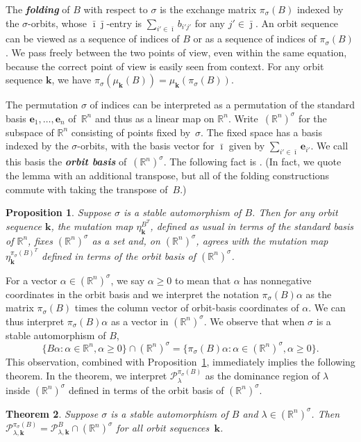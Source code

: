 \documentclass{amsart}
\newtheorem{proposition}{Proposition}[section]
\newtheorem{theorem}[proposition]{Theorem}
\theoremstyle{definition}
\theoremstyle{remark}
\numberwithin{equation}{section}
\newcommand{\newword}[1]{\textbf{\emph{#1}}}
\newcommand{\reals}{\mathbb R}
\newcommand{\sett}[1]{{\bigl\lbrace #1 \bigr\rbrace}}
\newcommand{\0}{{\mathbf{0}}}
\newcommand{\kk}{{\boldsymbol{k}}}
\newcommand{\e}{\mathbf{e}}
\renewcommand{\P}{\mathcal{P}}
\begin{document}
The \newword{folding} of $B$ with respect to $\sigma$ is the exchange matrix $\pi_\sigma(B)$ indexed by the $\sigma$-orbits, whose $\bar\imath\bar\jmath$-entry is $\sum_{i'\in\bar\imath}b_{i'j'}$ for any $j'\in\bar\jmath$.
An orbit sequence can be viewed as a sequence of indices of $B$ or as a sequence of indices of $\pi_\sigma(B)$.
We pass freely between the two points of view, even within the same equation, because the correct point of view is easily seen from context.
For any orbit sequence $\kk$, we have $\pi_\sigma(\mu_\kk(B))=\mu_\kk(\pi_\sigma(B))$.

The permutation $\sigma$ of indices can be interpreted as a permutation of the standard basis $\e_1,\ldots,\e_n$ of~$\reals^n$ and thus as a linear map on $\reals^n$.
Write~$(\reals^n)^\sigma$ for the subspace of $\reals^n$ consisting of points fixed by~$\sigma$.
The fixed space has a basis indexed by the $\sigma$-orbits, with the basis vector for $\bar\imath$ given by $\sum_{i'\in\bar\imath}\e_{i'}$.
We call this basis the \newword{orbit basis} of~$(\reals^n)^\sigma$.
The following fact is \cite[Lemma~2.4.6]{VielThesis}. 
(In fact, we quote the lemma with an additional transpose, but all of the folding constructions commute with taking the transpose of~$B$.)
\begin{proposition}\label{VielLemma}
Suppose $\sigma$ is a stable automorphism of $B$.
Then for any orbit sequence $\kk$, the mutation map $\eta^{B^T}_\kk$, defined as usual in terms of the standard basis of $\reals^n$, fixes $(\reals^n)^\sigma$ as a set and, on $(\reals^n)^\sigma$, agrees with the mutation map $\eta_\kk^{\pi_\sigma(B)^T}$ defined in terms of the orbit basis of $(\reals^n)^\sigma$.
\end{proposition}

For a vector $\alpha\in(\reals^n)^\sigma$, we say $\alpha\ge0$ to mean that $\alpha$ has nonnegative coordinates in the orbit basis and we interpret the notation $\pi_\sigma(B)\alpha$ as the matrix $\pi_\sigma(B)$ times the column vector of orbit-basis coordinates of $\alpha$.
We can thus interpret $\pi_\sigma(B)\alpha$ as a vector in $(\reals^n)^\sigma$.
We observe that when $\sigma$ is a stable automorphism of $B$,
\[\sett{B\alpha:\alpha\in\reals^n,\alpha\ge0}\cap(\reals^n)^\sigma=\sett{\pi_\sigma(B)\alpha:\alpha\in(\reals^n)^\sigma,\alpha\ge0}.\]
This observation, combined with Proposition~\ref{VielLemma}, immediately implies the following theorem.
In the theorem, we interpret $\P_\lambda^{\pi_\sigma(B)}$ as the dominance region of $\lambda$ inside $(\reals^n)^\sigma$ defined in terms of the orbit basis of $(\reals^n)^\sigma$.
\begin{theorem}\label{fold dom reg}
Suppose $\sigma$ is a stable automorphism of $B$ and $\lambda\in(\reals^n)^\sigma$.
Then $\P_{\lambda,\kk}^{\pi_\sigma(B)}=\P_{\lambda,\kk}^B\cap(\reals^n)^\sigma$ for all orbit sequences~$\kk$.
\end{theorem}
\end{document}

